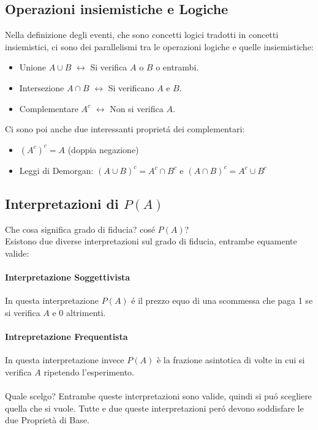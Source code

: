 \subsection*{Operazioni insiemistiche e Logiche}
Nella definizione degli eventi, che sono concetti logici tradotti in concetti insiemistici, ci sono dei parallelismi tra le operazioni logiche e quelle insiemistiche:
\begin{itemize}
    \item Unione $A\cup B$ $\longleftrightarrow$ Si verifica $A$ o $B$ o entrambi.
    \item Intersezione $A \cap B$ $\longleftrightarrow$ Si verificano $A$ e $B$.
    \item Complementare $A^c$ $\longleftrightarrow$ Non si verifica $A$.
\end{itemize}
Ci sono poi anche due interessanti proprietá dei complementari:
\begin{itemize}
    \item $(A^c)^c = A$ (doppia negazione)
    \item Leggi di Demorgan: $(A \cup B)^c = A^c \cap B^c$ e $(A \cap B)^c = A^c \cup B^c$
\end{itemize}

\subsection*{Interpretazioni di $P(A)$}
Che cosa significa grado di fiducia? cosé $P(A)$?
\\Esistono due diverse interpretazioni sul grado di fiducia, entrambe equamente valide:
\paragraph{Interpretazione Soggettivista} In questa interpretazione $P(A)$ é il prezzo equo di una scommessa che paga 1 se si 
verifica $A$ e 0 altrimenti.
\paragraph{Intrepretazione Frequentista} In questa interpretazione invece $P(A)$ è la frazione asintotica di volte in cui si verifica $A$ ripetendo l'esperimento.

\paragraph*{}Quale scelgo? Entrambe queste interpretazioni sono valide, quindi si puó scegliere quella che si vuole.
Tutte e due queste interpretazioni peró devono soddisfare le due Proprietà di Base.

